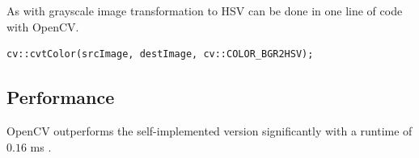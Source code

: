 \noindent
As with grayscale image transformation to HSV can be done in one line of code with OpenCV. 

\begin{listing}[H]
    \begin{verbatim}
cv::cvtColor(srcImage, destImage, cv::COLOR_BGR2HSV);
    \end{verbatim}
    \label{listing:hsv_opencv}
\end{listing}

\subsection{Performance}

OpenCV outperforms the self-implemented version significantly with a runtime of $ 0.16 $ ms .